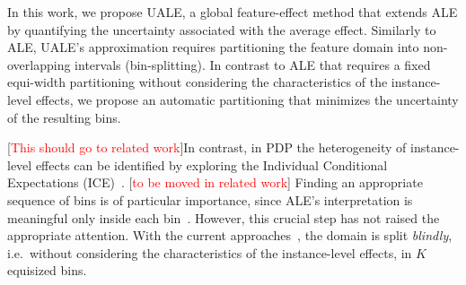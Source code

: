\documentclass[twoside]{article}
\newcommand{\todo}[1]{[\textcolor{red}{#1}]}
\begin{document}



In this work, we propose UALE,  a global feature-effect method that extends ALE by quantifying the uncertainty associated with the average effect. 
Similarly to ALE, UALE's approximation requires partitioning the feature domain into non-overlapping intervals (bin-splitting). In contrast to ALE that requires a fixed equi-width partitioning without considering the characteristics of
the instance-level effects, we propose an automatic partitioning that minimizes the uncertainty of the resulting bins. 




\color{blue}\todo{This should go to related work}In contrast, in PDP the
heterogeneity of instance-level effects can be identified by exploring
the Individual Conditional Expectations
(ICE)~\citep{goldstein2015peeking}. \color{black}
\color{blue}\todo{to be moved in related work}
Finding
an appropriate sequence of bins is of particular importance, since
ALE's interpretation is meaningful only inside each
bin~\citep{molnar2022}. However, this crucial step has not raised the
appropriate attention. With the current
approaches~\citep{apley2020visualizing, gkolemis22}, the domain is
split \emph{blindly}, i.e.~without considering the characteristics of
the instance-level effects, in \(K\) equisized bins.\color{black}
\end{document}
